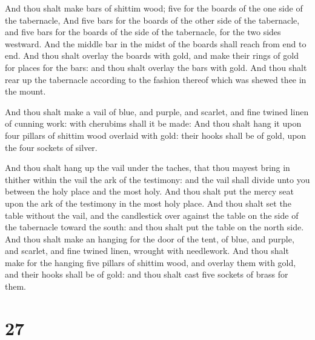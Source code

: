  And thou shalt make bars of shittim wood; five for the
boards of the one side of the tabernacle,  And five bars
for the boards of the other side of the tabernacle, and five bars for
the boards of the side of the tabernacle, for the two sides westward.
 And the middle bar in the midst of the boards shall reach
from end to end.  And thou shalt overlay the boards with
gold, and make their rings of gold for places for the bars: and thou
shalt overlay the bars with gold.  And thou shalt rear up
the tabernacle according to the fashion thereof which was shewed thee in
the mount.

 And thou shalt make a vail of blue, and purple, and
scarlet, and fine twined linen of cunning work: with cherubims shall it
be made:  And thou shalt hang it upon four pillars of
shittim wood overlaid with gold: their hooks shall be of gold, upon the
four sockets of silver.

 And thou shalt hang up the vail under the taches, that
thou mayest bring in thither within the vail the ark of the testimony:
and the vail shall divide unto you between the holy place and the most
holy.  And thou shalt put the mercy seat upon the ark of
the testimony in the most holy place.  And thou shalt set
the table without the vail, and the candlestick over against the table
on the side of the tabernacle toward the south: and thou shalt put the
table on the north side.  And thou shalt make an hanging
for the door of the tent, of blue, and purple, and scarlet, and fine
twined linen, wrought with needlework.  And thou shalt make
for the hanging five pillars of shittim wood, and overlay them with
gold, and their hooks shall be of gold: and thou shalt cast five sockets
of brass for them.

\hypertarget{section-26}{%
\section{27}\label{section-26}}


